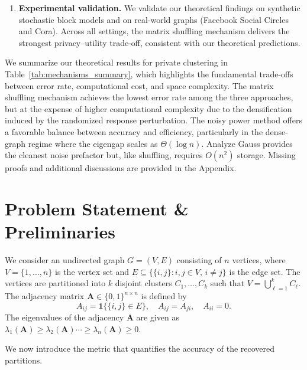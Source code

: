 \documentclass[11pt]{article}
\theoremstyle{plain}
\theoremstyle{definition}
\theoremstyle{remark}
\begin{document}
\begin{enumerate}[leftmargin=*, itemsep=2pt, topsep=2pt]
\item \textbf{Experimental validation.} We validate our theoretical findings on synthetic stochastic block models and on real-world graphs (Facebook Social Circles and Cora). Across all settings, the matrix shuffling mechanism delivers the strongest privacy--utility trade-off, consistent with our theoretical predictions.

\end{enumerate}

We summarize our theoretical results for private clustering in Table~\ref{tab:mechanisms_summary}, which highlights the fundamental trade-offs between error rate, computational cost, and space complexity. The matrix shuffling mechanism achieves the lowest error rate among the three approaches, but at the expense of higher computational complexity due to the densification induced by the randomized response perturbation. The noisy power method offers a favorable balance between accuracy and efficiency, particularly in the dense-graph regime where the eigengap scales as $\Theta(\log n)$. Analyze Gauss provides the cleanest noise prefactor but, like shuffling, requires $O(n^2)$ storage. Missing proofs and additional discussions are provided in the Appendix.


\section{Problem Statement  \& Preliminaries}
\label{sec:preliminaries_and_problem_statement}


We consider an undirected graph $G=(V,E)$ consisting of $n$ vertices, 
where $V=\{1,\dots,n\}$ is the vertex set and $E \subseteq \{\{i,j\}: i,j \in V,\, i\neq j\}$ 
is the edge set. 
The vertices are partitioned into $k$ disjoint clusters 
$C_{1},\dots,C_{k}$ such that $V=\bigcup_{\ell=1}^{k} C_{\ell}$. 
The adjacency matrix $\mathbf{A}\in\{0,1\}^{n\times n}$ is defined by
\[
A_{ij}=\mathbf{1}\{\{i,j\}\in E\}, \quad A_{ij}=A_{ji}, \quad A_{ii}=0.
\]
The eigenvalues of the adjacency $\mathbf{A}$ are given as $\lambda_{1}(\mathbf{A}) \geq \lambda_{2}(\mathbf{A}) \cdots \geq \lambda_{n}(\mathbf{A}) \geq 0$.







We now introduce the metric that quantifies the accuracy of the recovered partitions.
\end{document}

